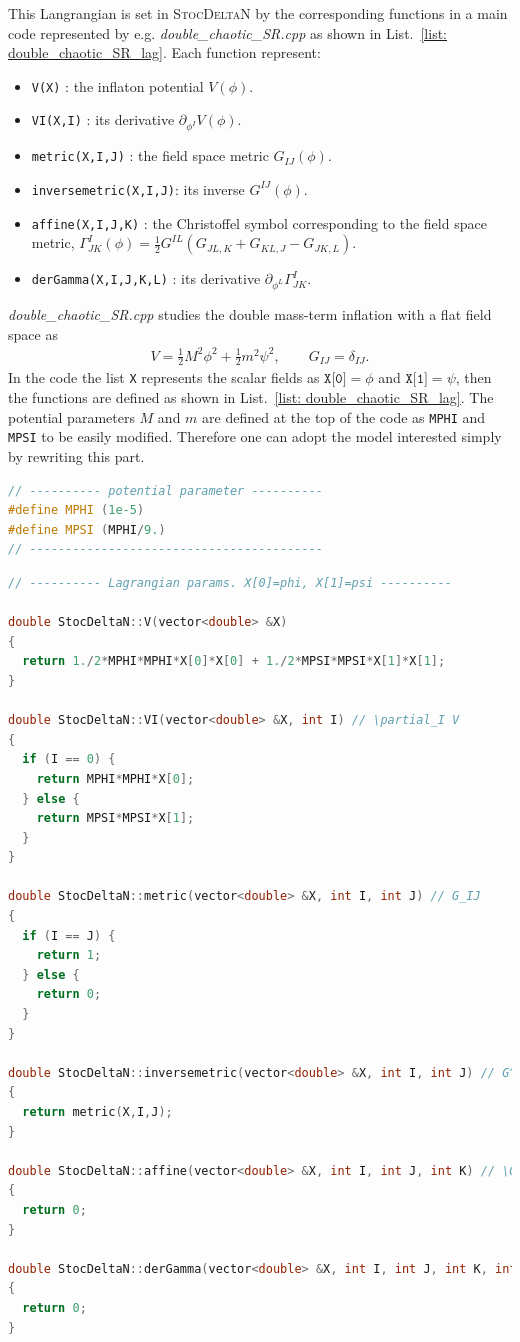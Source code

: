 \documentclass[aps, prd
, preprint
, nofootinbib 
, notitlepage
, superscriptaddress
, longbibliography
]{revtex4-1}
\newcommand{\bae}[1]{\begin{align} #1 \end{align}}
\begin{document}
This Langrangian is set in \textsc{StocDeltaN} by the corresponding functions in a main code represented by e.g. \textit{double\_chaotic\_SR.cpp}
as shown in List.~\ref{list: double_chaotic_SR_lag}.
Each function represent:
\begin{itemize}
\item \texttt{V(X)} : the inflaton potential $V(\phi)$.
\item \texttt{VI(X,I)} : its derivative $\partial_{\phi^I}V(\phi)$.
\item \texttt{metric(X,I,J)} : the field space metric $G_{IJ}(\phi)$.
\item \texttt{inversemetric(X,I,J)}: its inverse $G^{IJ}(\phi)$.
\item \texttt{affine(X,I,J,K)} : the Christoffel symbol corresponding to the field space metric, $\Gamma^I_{JK}(\phi)=\frac{1}{2}G^{IL}(G_{JL,K}+G_{KL,J}-G_{JK,L})$.
\item \texttt{derGamma(X,I,J,K,L)} : its derivative $\partial_{\phi^L}\Gamma^I_{JK}$.
\end{itemize}
\textit{double\_chaotic\_SR.cpp} studies the double mass-term inflation with a flat field space as
\bae{
	V=\frac{1}{2}M^2\phi^2+\frac{1}{2}m^2\psi^2, \qquad G_{IJ}=\delta_{IJ}.
}
In the code the list \texttt{X} represents the scalar fields as $\texttt{X[0]}=\phi$ and $\texttt{X[1]}=\psi$, then the functions are defined as shown 
in List.~\ref{list: double_chaotic_SR_lag}. The potential parameters $M$ and $m$ are defined at the top of the code as \texttt{MPHI} and \texttt{MPSI} to be easily modified.
Therefore one can adopt the model interested simply by rewriting this part.

\begin{lstlisting}[language = C++, caption={\textit{sample/double\_chaotic\_SR.cpp}}, label=list: double_chaotic_SR_lag, firstnumber = 20]
// ---------- potential parameter ----------
#define MPHI (1e-5)
#define MPSI (MPHI/9.)
// -----------------------------------------
\end{lstlisting}

\begin{lstlisting}[language = C++, firstnumber = 99]
// ---------- Lagrangian params. X[0]=phi, X[1]=psi ----------

double StocDeltaN::V(vector<double> &X)
{
  return 1./2*MPHI*MPHI*X[0]*X[0] + 1./2*MPSI*MPSI*X[1]*X[1];
}

double StocDeltaN::VI(vector<double> &X, int I) // \partial_I V
{
  if (I == 0) {
    return MPHI*MPHI*X[0];
  } else {
    return MPSI*MPSI*X[1];
  }
}

double StocDeltaN::metric(vector<double> &X, int I, int J) // G_IJ
{
  if (I == J) {
    return 1;
  } else {
    return 0;
  }
}

double StocDeltaN::inversemetric(vector<double> &X, int I, int J) // G^IJ
{
  return metric(X,I,J);
}

double StocDeltaN::affine(vector<double> &X, int I, int J, int K) // \Gamma^I_JK
{
  return 0;
}

double StocDeltaN::derGamma(vector<double> &X, int I, int J, int K, int L) //  \partial_L \Gamma^I_JK
{
  return 0;
}
\end{lstlisting}
\end{document}
